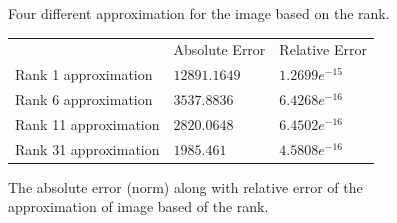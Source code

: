 \begin{figure}[tbh]
\centering        
   \caption{Four different approximation for the image based on the rank. }
   \label{fig:fig4_c}
\end{figure}

\begin{figure}[tbh]
 \centering    
\begin{tabular}{ |p{5cm}|| p{3cm}|p{3cm}|}
 \hline
 & Absolute Error &  Relative Error \\ \hhline{|=|=|=|}
 \hline
 Rank 1 approximation  & $12891.1649$ & $1.2699e^{-15}$    \\
 Rank 6 approximation  & $3537.8836$  & $6.4268e^{-16}$   \\
 Rank 11 approximation & $2820.0648$  & $6.4502e^{-16}$   \\
 Rank 31 approximation & $1985.461 $  & $4.5808e^{-16}$   \\
 \hline
\end{tabular} 
\caption{The absolute error (norm) along with relative error of the approximation of  image based of the rank.}
   \label{tab:error}
\end{figure} 